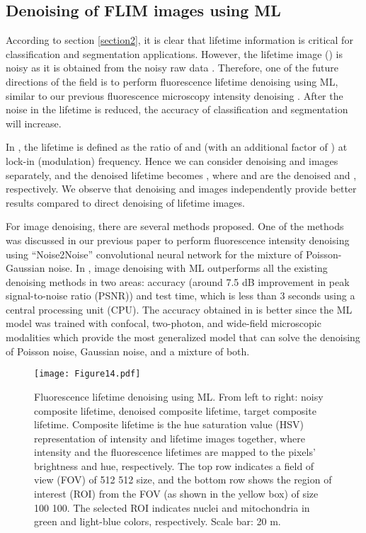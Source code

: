 \documentclass[12pt]{iopart}
\begin{document}
\subsection{Denoising of FLIM images using ML} \label{denoising_lifetime}
According to section \ref{section2}, it is clear that lifetime information is critical for classification and segmentation applications. However, the lifetime image () is noisy as it is obtained from the noisy raw data . Therefore, one of the future directions of the field is to perform fluorescence lifetime denoising using ML, similar to our previous fluorescence microscopy intensity denoising \cite{cvpr}. After the noise in the lifetime is reduced, the accuracy of classification and segmentation will increase. 

In \cite{phasors}, the lifetime is defined as the ratio of  and  (with an additional factor of ) at lock-in (modulation) frequency. Hence we can consider denoising  and  images separately, and the denoised lifetime becomes , where  and  are the denoised  and , respectively. We observe that denoising  and  images independently provide better results compared to direct denoising of lifetime images.

For image denoising, there are several methods proposed. One of the methods was discussed in our previous paper \cite{cvpr} to perform fluorescence intensity denoising using \enquote{Noise2Noise} convolutional neural network for the mixture of Poisson-Gaussian noise. In \cite{cvpr}, image denoising with ML outperforms all the existing denoising methods in two areas: accuracy (around 7.5 dB improvement in peak signal-to-noise ratio (PSNR)) and test time, which is less than 3 seconds using a central processing unit (CPU). The accuracy obtained in \cite{cvpr} is better since the ML model was trained with confocal, two-photon, and wide-field microscopic modalities which provide the most generalized model that can solve the denoising of Poisson noise, Gaussian noise, and a mixture of both.

\begin{figure}[!t]
\centering
\texttt{[image: Figure14.pdf]}
\caption{Fluorescence lifetime denoising using ML. From left to right: noisy composite lifetime, denoised composite lifetime, target composite lifetime. Composite lifetime is the hue saturation value (HSV) representation of intensity and lifetime images together, where intensity and the fluorescence lifetimes are mapped to the pixels’ brightness and hue, respectively. The top row indicates a field of view (FOV) of 512  512 size, and the bottom row shows the region of interest (ROI) from the FOV (as shown in the yellow box) of size 100  100. The selected ROI indicates nuclei and mitochondria in green and light-blue colors, respectively. Scale bar: 20 m.}\label{pd_fig1}
\end{figure}
\end{document}

